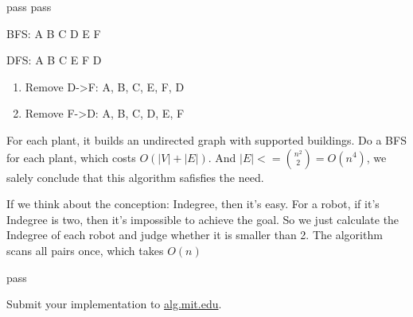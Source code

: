 \documentclass[12pt,twoside]{article}
\begin{document}


\begin{problems}

\problem  %

\begin{problemparts}
\problempart %
pass
\problempart %
pass
\problempart %

BFS: A B C D E F
 DFS: A B C E F D
\problempart %
\begin{enumerate}
  \item Remove D->F: {A, B, C, {E, F}, D}
  \item Remove F->D: {A, B, C, D, E, F}
\end{enumerate}
\end{problemparts}

\newpage
\problem  %
For each plant, it builds an undirected graph with supported buildings. 
Do a BFS for each plant, which costs $O(|V|+|E|)$. And $|E|<=\binom{n^2}{2}=O(n^4)$,
we salely conclude that this algorithm safisfies the need.

\problem  %
If we think about the conception: Indegree, then it's easy. For a robot, if it's Indegree
is two, then it's impossible to achieve the goal. So we just calculate the Indegree of each
robot and judge whether it is smaller than 2. The algorithm scans all pairs once, which takes $O(n)$

\problem  %
pass

\problem  %


\problem  %

\begin{problemparts}
\problempart %
\problempart %
\problempart %
\problempart Submit your implementation to {\small\url{alg.mit.edu}}.
\end{problemparts}

\end{problems}
\end{document}

